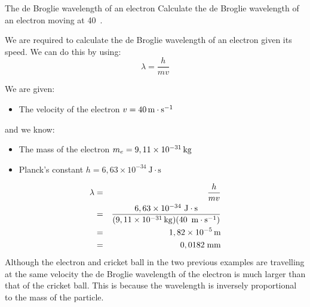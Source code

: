 \begin{wex}{The de Broglie wavelength of an electron}
{Calculate the de Broglie wavelength of an electron moving at 40~\ms.}
{
We are required to calculate the de Broglie wavelength of an electron given its speed. We can do this by using:
$$\lambda=\frac{h}{mv}$$

We are given:
\begin{itemize}
\item The velocity of the electron {$v=40\,\mathrm{m \cdot s^{-1}}$}
\end{itemize}
and we know:
\begin{itemize}
\item The mass of the electron {$m_{e}=9,11 \times 10^{-31}\,\mathrm{kg}$}
\item Planck's constant {$h=6,63 \times 10^{-34}~\mathrm{J\cdot s}$}
\end{itemize}

\begin{eqnarray*}
\lambda&=&\frac{h}{mv}\\
&=&\frac{6,63\times10^{-34}~\mathrm{J\cdot s}}{(9,11 \times 10^{-31}\,\mathrm{kg})(40~\,\mathrm{m \cdot s^{-1}})}\\
& = & 1,82 \times 10^{-5}\,\rm{m}\\
&=&0,0182\;\mathrm{mm}
\end{eqnarray*}
Although the electron and cricket ball in the two previous examples are travelling at the same velocity the de Broglie wavelength of the electron is much larger than that of the cricket ball. This is because the wavelength is inversely proportional to the mass of the particle.
}
\end{wex}

